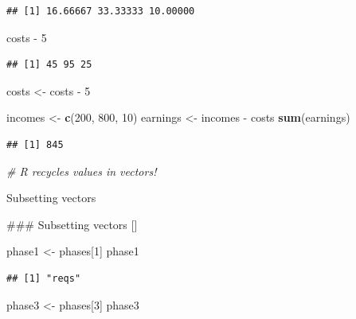 \documentclass[]{book}
\newenvironment{Shaded}{\begin{snugshade}}{\end{snugshade}}
\newcommand{\KeywordTok}[1]{\textcolor[rgb]{0.13,0.29,0.53}{\textbf{{#1}}}}
\newcommand{\DecValTok}[1]{\textcolor[rgb]{0.00,0.00,0.81}{{#1}}}
\newcommand{\StringTok}[1]{\textcolor[rgb]{0.31,0.60,0.02}{{#1}}}
\newcommand{\CommentTok}[1]{\textcolor[rgb]{0.56,0.35,0.01}{\textit{{#1}}}}
\newcommand{\NormalTok}[1]{{#1}}
\begin{document}
\begin{verbatim}
## [1] 16.66667 33.33333 10.00000
\end{verbatim}

\begin{Shaded}
\begin{Highlighting}[]
\NormalTok{costs -}\StringTok{ }\DecValTok{5}
\end{Highlighting}
\end{Shaded}

\begin{verbatim}
## [1] 45 95 25
\end{verbatim}

\begin{Shaded}
\begin{Highlighting}[]
\NormalTok{costs <-}\StringTok{ }\NormalTok{costs -}\StringTok{ }\DecValTok{5}

\NormalTok{incomes <-}\StringTok{ }\KeywordTok{c}\NormalTok{(}\DecValTok{200}\NormalTok{, }\DecValTok{800}\NormalTok{, }\DecValTok{10}\NormalTok{)}
\NormalTok{earnings <-}\StringTok{ }\NormalTok{incomes -}\StringTok{ }\NormalTok{costs}
\KeywordTok{sum}\NormalTok{(earnings)}
\end{Highlighting}
\end{Shaded}

\begin{verbatim}
## [1] 845
\end{verbatim}

\begin{Shaded}
\begin{Highlighting}[]
\CommentTok{# R recycles values in vectors!}
\end{Highlighting}
\end{Shaded}

Subsetting vectors

\begin{Shaded}
\begin{Highlighting}[]
\NormalTok{### Subsetting vectors  []}

\NormalTok{phase1 <-}\StringTok{ }\NormalTok{phases[}\DecValTok{1}\NormalTok{]}
\NormalTok{phase1}
\end{Highlighting}
\end{Shaded}

\begin{verbatim}
## [1] "reqs"
\end{verbatim}

\begin{Shaded}
\begin{Highlighting}[]
\NormalTok{phase3 <-}\StringTok{ }\NormalTok{phases[}\DecValTok{3}\NormalTok{]}
\NormalTok{phase3}
\end{Highlighting}
\end{Shaded}
\end{document}
